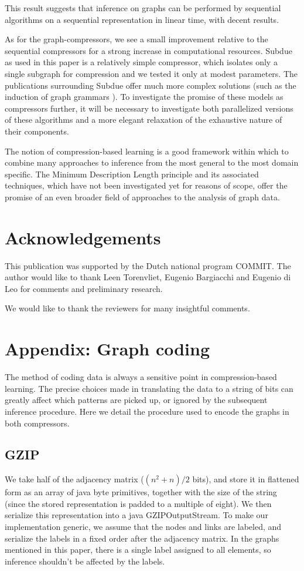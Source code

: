 \documentclass{article}
\begin{document}
This result suggests that inference on graphs can be performed by sequential algorithms on a sequential representation in linear time, with decent results.

As for the graph-compressors, we see a small improvement relative to the sequential compressors for a strong increase in computational resources. Subdue as used in this paper is a relatively simple compressor, which isolates only a single subgraph for compression and we tested it only at modest parameters. The publications surrounding Subdue offer much more complex solutions (such as the induction of graph grammars \cite{jonyer2004mdl}). To investigate the promise of these models as compressors further, it will be necessary to investigate both parallelized versions of these algorithms and a more elegant relaxation of the exhaustive nature of their components. 

The notion of compression-based learning is a good framework within which to combine many approaches to inference from the most general to the most domain specific. The Minimum Description Length principle and its associated techniques, which have not been investigated yet for reasons of scope, offer the promise of an even broader field of approaches to the analysis of graph data.

\section*{Acknowledgements}

This publication was supported by the Dutch national program COMMIT. The author would like to thank Leen Torenvliet, Eugenio Bargiacchi and Eugenio di Leo for comments and preliminary research.

We would like to thank the reviewers for many insightful comments.

\appendix

\section*{Appendix: Graph coding}

The method of coding data is always a sensitive point in compression-based learning. The precise choices made in translating the data to a string of bits can greatly affect which patterns are picked up, or ignored by the subsequent inference procedure. Here we detail the procedure used to encode the graphs in both compressors.

\subsection*{GZIP}
We take half of the adjacency matrix ($(n^2 + n)/2$ bits), and store it in flattened form as an array of java byte primitives, together with the size of the string (since the stored representation is padded to a multiple of eight). We then serialize this representation into a java GZIPOutputStream. To make our implementation generic, we assume that the nodes and links are labeled, and serialize the labels in a fixed order after the adjacency matrix. In the graphs mentioned in this paper, there is a single label assigned to all elements, so inference shouldn't be affected by the labels.
\end{document}

